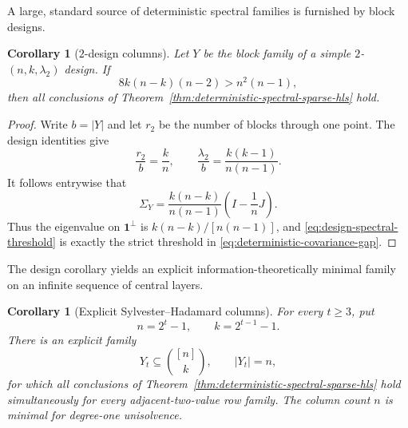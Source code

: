 \documentclass[11pt]{article}
\newtheorem{corollary}[theorem]{Corollary}
\theoremstyle{definition}
\theoremstyle{remark}
\newcommand{\1}{\mathbf 1}
\begin{document}
A large, standard source of deterministic spectral families is furnished by
block designs.

\begin{corollary}[\(2\)-design columns]
\label{cor:two-design-spectral-hls}
Let \(Y\) be the block family of a simple \(2\)-\((n,k,\lambda_2)\) design.
If
\begin{equation}\label{eq:design-spectral-threshold}
 8k(n-k)(n-2)>n^2(n-1),
\end{equation}
then all conclusions of
Theorem~\ref{thm:deterministic-spectral-sparse-hls} hold.
\end{corollary}

\begin{proof}
Write \(b=|Y|\) and let \(r_2\) be the number of blocks through one point.
The design identities give
\[
 \frac{r_2}{b}=\frac kn,
 \qquad
 \frac{\lambda_2}{b}=\frac{k(k-1)}{n(n-1)}.
\]
It follows entrywise that
\[
 \Sigma_Y=\frac{k(n-k)}{n(n-1)}
 \left(I-\frac1nJ\right).
\]
Thus the eigenvalue on \(\mathbf1^\perp\) is
\(k(n-k)/[n(n-1)]\), and
\eqref{eq:design-spectral-threshold} is exactly the strict threshold in
\eqref{eq:deterministic-covariance-gap}.
\end{proof}

The design corollary yields an explicit information-theoretically minimal
family on an infinite sequence of central layers.

\begin{corollary}[Explicit Sylvester--Hadamard columns]
\label{cor:sylvester-hadamard-sparse-hls}
For every \(t\ge3\), put
\[
 n=2^t-1,
 \qquad
 k=2^{t-1}-1.
\]
There is an explicit family
\[
 Y_t\subseteq\binom{[n]}k,
 \qquad |Y_t|=n,
\]
for which all conclusions of
Theorem~\ref{thm:deterministic-spectral-sparse-hls} hold simultaneously for
every adjacent-two-value row family.  The column count \(n\) is minimal for
degree-one unisolvence.
\end{corollary}
\end{document}
